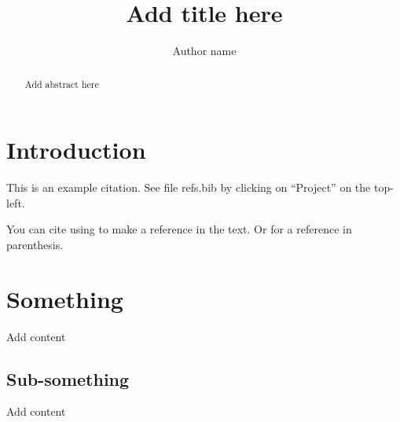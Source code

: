 \documentclass[a4paper, 12pt, one column, aas_macros]{article}
\title{Add title here}
\author{Author name}
\begin{document}
\maketitle

\begin{abstract}
Add abstract here
\end{abstract}

\section{Introduction}

This is an example citation. See file refs.bib by clicking on ``Project'' on the top-left. 

You can cite using \citet{Claydon17} to make a reference in the text. Or \citep{Claydon17} for a reference in parenthesis. 

\section{Something}

Add content

\subsection{Sub-something}

Add content


\end{document}
